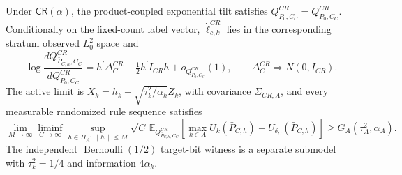 Under \(\mathsf{CR}(\alpha)\), the product-coupled exponential tilt satisfies \(Q^{CR}_{\bar P_0,C_C}=Q^{CR}_{P_0,C_C}\). Conditionally on the fixed-count label vector, \(\dot\ell_{c,k}^{CR}\) lies in the corresponding stratum observed \(L^2_0\) space and \[\log\frac{dQ^{CR}_{\bar P_{C,h},C_C}}{dQ^{CR}_{P_0,C_C}}=h^{\prime}\Delta_C^{CR}-\tfrac12h^{\prime}I_{CR}h+o_{Q^{CR}_{P_0,C_C}}(1),\qquad \Delta_C^{CR}\Rightarrow N(0,I_{CR}).\] The active limit is \(X_k=h_k+\sqrt{\tau_k^2/\alpha_k}Z_k\), with covariance \(\Sigma_{CR,A}\), and every measurable randomized rule sequence satisfies \[\lim_{M\to\infty}\liminf_{C\to\infty}\sup_{h\in H_A:\lVert h\rVert\leq M}\sqrt C\,\mathbb E_{Q^{CR}_{\bar P_{C,h},C_C}}[\max_{k\in A}U_k(\bar P_{C,h})-U_{\delta_C}(\bar P_{C,h})]\geq G_A(\tau_A^2,\alpha_A).\] The independent \(\operatorname{Bernoulli}(1/2)\) target-bit witness is a separate submodel with \(\tau_k^2=1/4\) and information \(4\alpha_k\).